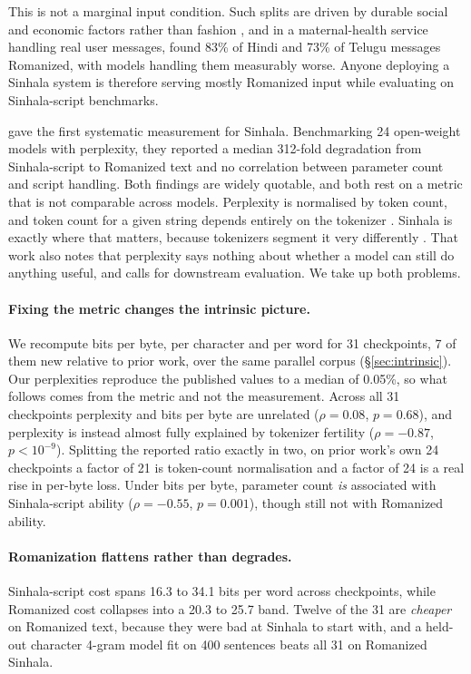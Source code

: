 \documentclass[11pt]{article}
\begin{document}
This is not a marginal input condition. Such splits are driven by durable social and
economic factors rather than fashion \citep{sengupta-etal-2024-hinglish}, and in a
maternal-health service handling real user messages,
\citet{khullar-etal-2025-scriptgap} found 83\% of Hindi and 73\% of Telugu messages
Romanized, with models handling them measurably worse. Anyone deploying a Sinhala
system is therefore serving mostly Romanized input while evaluating on
Sinhala-script benchmarks.

\citet{rajapakse-weerasinghe-2026-script} gave the first systematic measurement
for Sinhala. Benchmarking 24 open-weight models with perplexity, they reported a
median 312-fold degradation from Sinhala-script to Romanized text and no
correlation between parameter count and script handling. Both findings are widely
quotable, and both rest on a metric that is not comparable across models.
Perplexity is normalised by token count, and token count for a given string
depends entirely on the tokenizer \citep{gao-etal-2020-pile,
magnusson-etal-2024-paloma}. Sinhala is exactly where that matters, because
tokenizers segment it very differently \citep{petrov-etal-2023-tokenizers,
ahia-etal-2023-languages}. That work also notes that perplexity says nothing
about whether a model can still do anything useful, and calls for downstream
evaluation. We take up both problems.

\paragraph{Fixing the metric changes the intrinsic picture.}
We recompute bits per byte, per character and per word for 31 checkpoints, 7 of them
new relative to prior work, over the same parallel corpus (\S\ref{sec:intrinsic}).
Our perplexities reproduce the published values to a median of 0.05\%, so what
follows comes from the metric and not the measurement. Across all 31 checkpoints
perplexity and bits per byte are unrelated ($\rho = 0.08$, $p = 0.68$), and
perplexity is instead almost fully explained by tokenizer fertility
($\rho = -0.87$, $p < 10^{-9}$). Splitting the reported ratio exactly in two, on
prior work's own 24 checkpoints a factor of 21 is token-count normalisation and a
factor of 24 is a real rise in per-byte loss. Under bits per byte, parameter count
\emph{is} associated with Sinhala-script ability ($\rho = -0.55$, $p = 0.001$),
though still not with Romanized ability.

\paragraph{Romanization flattens rather than degrades.}
Sinhala-script cost spans 16.3 to 34.1 bits per word across checkpoints, while
Romanized cost collapses into a 20.3 to 25.7 band. Twelve of the 31 are
\emph{cheaper} on Romanized text, because they were bad at Sinhala to start with,
and a held-out character 4-gram model fit on 400 sentences beats all 31 on
Romanized Sinhala.
\end{document}
